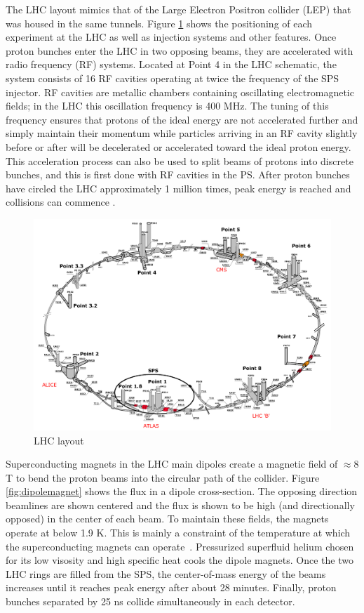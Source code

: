 The LHC layout mimics that of the Large Electron Positron collider (LEP) that was housed in the same tunnels. Figure \ref{fig:LHClayout} shows the positioning of each experiment at the LHC as well as injection systems and other features. Once proton bunches enter the LHC in two opposing beams, they are accelerated with radio frequency (RF) systems. Located at Point 4 in the LHC schematic, the system consists of 16 RF cavities operating at twice the frequency of the SPS injector. RF cavities are metallic chambers containing oscillating electromagnetic fields; in the LHC this oscillation frequency is 400 MHz. The tuning of this frequency ensures that protons of the ideal energy are not accelerated further and simply maintain their momentum while particles arriving in an RF cavity slightly before or after will be decelerated or accelerated toward the ideal proton energy. This acceleration process can also be used to split beams of protons into discrete bunches, and this is first done with RF cavities in the PS. After proton bunches have circled the LHC approximately 1 million times, peak energy is reached and collisions can commence \cite{radiofrequency}.

\begin{figure}[!h]
        \centering
    \includegraphics[width=.6\textwidth]{Pictures/LHClayout.PNG}
    \caption{LHC layout \cite{LHCref}}
    \label{fig:LHClayout}
\end{figure}

Superconducting magnets in the LHC main dipoles create a magnetic field of $\approx 8$ T to bend the proton beams into the circular path of the collider. Figure \ref{fig:dipolemagnet} shows the flux in a dipole cross-section. The opposing direction beamlines are shown centered and the flux is shown to be high (and directionally opposed) in the center of each beam. To maintain these fields, the magnets operate at below 1.9 K. This is mainly a constraint of the temperature at which the superconducting magnets can operate~\cite{magnets}. Pressurized superfluid helium chosen for its low visosity and high specific heat cools the dipole magnets. Once the two LHC rings are filled from the SPS, the center-of-mass energy of the beams increases until it reaches peak energy after about 28 minutes. Finally, proton bunches separated by 25 ns collide simultaneously in each detector.  

